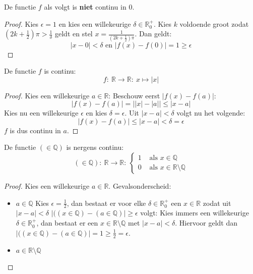 \documentclass[main.tex]{subfiles}
\begin{document}
\begin{tvb}
  De functie $f$ als volgt is \textbf{niet} continu in $0$.
  \begin{proof}
  Kies $\epsilon = 1$ en kies een willekeurige $\delta \in \mathbb{R}_{0}^{+}$.
  Kies $k$ voldoende groot zodat $\left(2k+\frac{1}{2}\right)\pi > \frac{1}{\delta}$ geldt en stel $x = \frac{1}{\left(2k+\frac{1}{2}\right)\pi}$.
  Dan geldt:
  \[ |x-0| < \delta \text{ en } |f(x)-f(0)| = 1 \ge \epsilon \]
  \end{proof}
\end{tvb}

\begin{vb}
  De functie $f$ is continu:
  \[ f:\ \mathbb{R} \rightarrow \mathbb{R}:\ x \mapsto |x| \]

  \begin{proof}
    Kies een willekeurige $a\in \mathbb{R}$:
    Beschouw eerst $|f(x)-f(a)|$:
    \[ |f(x)-f(a)| = \left||x|-|a|\right| \le |x-a| \]
    Kies nu een willekeurige $\epsilon$ en kies $\delta = \epsilon$.
    Uit $|x-a| <\delta$ volgt nu het volgende:
    \[ |f(x)-f(a)| \le |x-a| < \delta = \epsilon \]
    $f$ is dus continu in $a$.
  \end{proof}
\end{vb}

\begin{vb}
  De functie $(\in \mathbb{Q})$ is nergens continu:
  \[
  (\in \mathbb{Q}):\ \mathbb{R} \rightarrow \mathbb{R}:\ 
  \left\{
    \begin{array}{rl}
      1 &\text{ als } x\in \mathbb{Q}\\
      0 &\text{ als } x\in \mathbb{R}\setminus \mathbb{Q}
    \end{array}
  \right.
  \]
  
  \begin{proof}
    Kies een willekeurige $a \in \mathbb{R}$.
    Gevalsonderscheid:
    \begin{itemize}
    \item $a\in \mathbb{Q}$
      Kies $\epsilon = \frac{1}{2}$, dan bestaat er voor elke $\delta \in \mathbb{R}_{0}^{+}$ een $x\in \mathbb{R}$ zodat uit $|x-a| < \delta$ $|((x \in \mathbb{Q})-(a\in \mathbb{Q})| \ge \epsilon$ volgt:
      Kies immers een willekeurige $\delta \in \mathbb{R}_{0}^{+}$, dan bestaat er een $x\in \mathbb{R}\setminus \mathbb{Q}$ met $|x-a| < \delta$. \needed
      Hiervoor geldt dan $|((x \in \mathbb{Q})-(a\in \mathbb{Q})| = 1 \ge \frac{1}{2} = \epsilon$.
    \item $a\in \mathbb{R}\setminus \mathbb{Q}$
    \end{itemize}
  \end{proof}
\end{vb}
\end{document}
